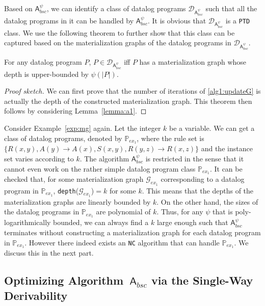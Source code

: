 \documentclass[final,1p,times]{elsarticle}
\begin{document}
Based on $\mathsf{A}_{bsc}^{\psi}$, we can identify a class of datalog programs
$\mathcal{D}_{\mathsf{A}_{bsc}^{\psi}}$ such that all the datalog programs in it can be handled
by $\mathsf{A}_{bsc}^{\psi}$.
It is obvious that $\mathcal{D}_{\mathsf{A}_{bsc}^{\psi}}$ is a \texttt{PTD} class.
We use the following theorem to further show that this class can be captured based on
the materialization graphs of the datalog programs in $\mathcal{D}_{\mathsf{A}_{bsc}^{\psi}}$.

\begin{theorem}\label{theorem:a1}
For any datalog program $P$, $P\in\mathcal{D}_{\mathsf{A}_{bsc}^{\psi}}$ iff $P$ has a
materialization graph whose depth is upper-bounded by $\psi(|P|)$.
\end{theorem}

\begin{proof}[Proof sketch]
We can first prove that the number of iterations
of \ref{alg1:updateG} is actually the depth of the constructed materialization
graph. This theorem then follows by considering
Lemma~\ref{lemma:a1}.
\end{proof}

Consider Example~\ref{exp:mg} again. Let the integer $k$ be a variable. We can
get a class of datalog programs, denoted by $\mathbb{P}_{ex_1}$, where the rule set 
is $\{R(x,y),A(y)\rightarrow A(x), S(x,y),R(y,z)\rightarrow R(x,z)\}$ and the instance
set varies according to $k$. The algorithm $\mathsf{A}_{bsc}^{\psi}$ is restricted in the sense that it cannot even work on the rather simple datalog program class $\mathbb{P}_{ex_1}$.
It can be checked that, for some materialization graph $\mathcal{G}_{ex_1}$
corresponding to a datalog program in $\mathbb{P}_{ex_1}$, \texttt{depth}($\mathcal{G}_{ex_1}$)$=k$ for some $k$.
This means that the depths of the materialization graphs are linearly bounded by $k$.
On the other hand, the sizes of the datalog programs in $\mathbb{P}_{ex_1}$ are polynomial of $k$.
Thus, for any $\psi$ that is poly-logarithmically bounded, we can always find a $k$ large
enough such that $\mathsf{A}_{bsc}^{\psi}$ terminates without constructing a materialization
graph for each datalog program in $\mathbb{P}_{ex_1}$.
However there indeed exists an \texttt{NC} algorithm that can handle $\mathbb{P}_{ex_1}$.
We discuss this in the next part.


\subsection{Optimizing Algorithm~$\mathsf{A}_{bsc}$ via the Single-Way Derivability}
\end{document}
